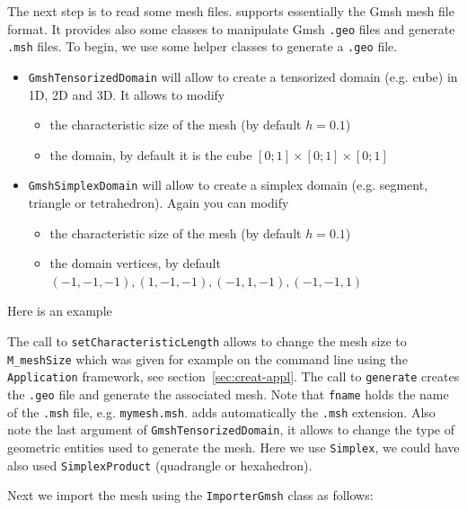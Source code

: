 

The next step is to read some mesh files. \feel supports essentially
the Gmsh mesh file format. It provides also some classes to manipulate
Gmsh \lstinline!.geo! files and generate \lstinline!.msh! files. To
begin, we use some helper classes to generate a \lstinline!.geo! file.

\begin{itemize}
\item \lstinline!GmshTensorizedDomain! will allow to create a
  tensorized domain (e.g. cube) in 1D, 2D and 3D. It allows to modify
  \begin{itemize}
  \item the characteristic size of the mesh (by default $h=0.1$)
  \item the domain, by default it is the cube $[0;1]\times[0;1]\times[0;1]$
  \end{itemize}
\item \lstinline!GmshSimplexDomain! will allow to create a simplex
  domain (e.g. segment, triangle or tetrahedron). Again you can modify
  \begin{itemize}
  \item the characteristic size of the mesh (by default $h=0.1$)
  \item the domain vertices, by default $(-1,-1,-1), (1,-1,-1), (-1,1,-1), (-1,-1,1)$
  \end{itemize}
\end{itemize}

Here is an example



The call to \lstinline!setCharacteristicLength! allows to change the
mesh size to \lstinline!M_meshSize! which was given for example on the
command line using the \lstinline!Application! framework, see
section~\ref{sec:creat-appl}. The call to \lstinline!generate! creates
the \lstinline!.geo! file and generate the associated mesh. Note that
\lstinline!fname! holds the name of the \lstinline!.msh! file,
e.g. \lstinline!mymesh.msh!. \feel adds automatically the
\lstinline!.msh!  extension. Also note the last argument of
\lstinline!GmshTensorizedDomain!, it allows to change the type of
geometric entities used to generate the mesh. Here we use
\lstinline!Simplex!, we could have also used
\lstinline!SimplexProduct! (quadrangle or hexahedron).


Next we import the mesh using the
\lstinline!ImporterGmsh! class as follows:

